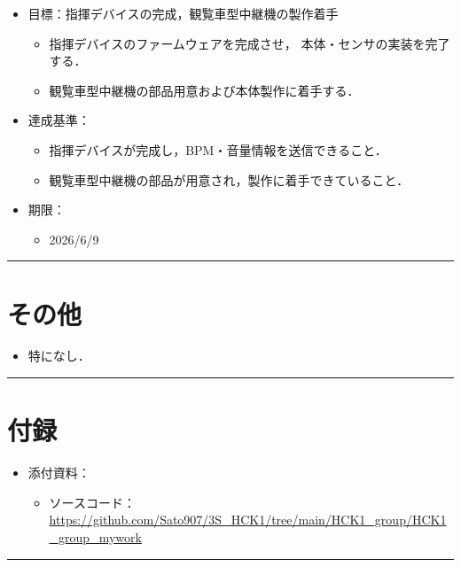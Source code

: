 \documentclass[uplatex,dvipdfmx,a4paper,11pt]{jsarticle}
\newcommand{\sectionrule}{\par\medskip\noindent\rule{\linewidth}{0.6pt}\par\medskip}
\begin{document}
\begin{itemize}

  \item 目標：指揮デバイスの完成，観覧車型中継機の製作着手
    \begin{itemize}
      \item 指揮デバイスのファームウェアを完成させ，
      本体・センサの実装を完了する．

      \item 観覧車型中継機の部品用意および本体製作に着手する．
    \end{itemize}

  \item 達成基準：
    \begin{itemize}
      \item 指揮デバイスが完成し，BPM・音量情報を送信できること．

      \item 観覧車型中継機の部品が用意され，製作に着手できていること．
    \end{itemize}

  \item 期限：
    \begin{itemize}
      \item 2026/6/9
    \end{itemize}

\end{itemize}


\sectionrule


\section{その他}

\begin{itemize}
  \item {}特になし．
\end{itemize}

\sectionrule


\section{付録}

\begin{itemize}
  \item 添付資料：
    \begin{itemize}
      \item ソースコード：\url{https://github.com/Sato907/3S_HCK1/tree/main/HCK1_group/HCK1_group_mywork}
    \end{itemize}

\end{itemize}

\sectionrule
\end{document}
